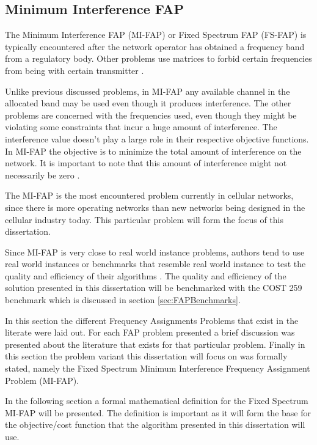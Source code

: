 \subsection{Minimum Interference FAP}
The Minimum Interference FAP (MI-FAP) or Fixed Spectrum FAP (FS-FAP) is typically encountered after the network operator has obtained a frequency band from a regulatory body. Other problems use matrices to forbid certain frequencies from being with certain transmitter \cite{Karen2004,Eisenblatter,MontemanniThesis,MultipleBinaryFAP}. 

Unlike previous discussed problems, in MI-FAP any available channel in the allocated band may be used even though it produces interference. The other problems are concerned with the frequencies used, even though they might be violating some constraints that incur a huge amount of interference\cite{Karen2004,Eisenblatter,MontemanniThesis,MultipleBinaryFAP}. The interference value doesn't play a large role in their respective objective functions\cite{Karen2004,Eisenblatter,MontemanniThesis,MultipleBinaryFAP}. In MI-FAP the objective is to minimize the total amount of interference on the network. It is important to note that this amount of interference might not necessarily be zero \cite{Karen2004,Eisenblatter,MontemanniThesis,MultipleBinaryFAP}.

The MI-FAP is the most encountered problem currently in cellular networks, since there is more operating networks than new networks being designed in the cellular industry today. This particular problem will form the focus of this dissertation. 

Since MI-FAP is very close to real world instance problems, authors tend to use real world instances or benchmarks that resemble real world instance to test the quality and efficiency of their algorithms \cite{Karen2004,Eisenblatter,MontemanniThesis,MultipleBinaryFAP}. The quality and efficiency of the solution presented in this dissertation will be benchmarked with the COST 259 benchmark which is discussed in section \ref{sec:FAPBenchmarks}.

In this section the different Frequency Assignments Problems that exist in the literate were laid out. For each FAP problem presented a brief discussion was presented about the literature that exists for that particular problem. Finally in this section the problem variant this dissertation will focus on was formally stated, namely the Fixed Spectrum Minimum Interference Frequency Assignment Problem (MI-FAP). 

In the following section a formal mathematical definition for the Fixed Spectrum MI-FAP will be presented. The definition is important as it will form the base for the objective/cost function that the algorithm presented in this dissertation will use.
